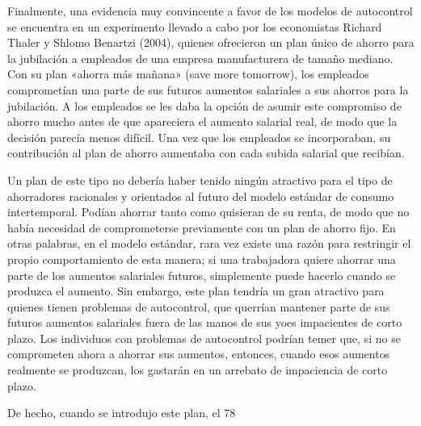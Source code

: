 \documentclass[10pt,a4paper]{article}
\begin{document}
Finalmente, una evidencia muy convincente a favor de los modelos de autocontrol se encuentra en un experimento llevado a cabo por los economistas Richard Thaler y Shlomo Benartzi (2004), quienes ofrecieron un plan único de ahorro para la jubilación a empleados de una empresa manufacturera de tamaño mediano. Con su plan «ahorra más mañana» (save more tomorrow), los empleados comprometían una parte de sus futuros aumentos salariales a sus ahorros para la jubilación. A los empleados se les daba la opción de asumir este compromiso de ahorro mucho antes de que apareciera el aumento salarial real, de modo que la decisión parecía menos difícil. Una vez que los empleados se incorporaban, su contribución al plan de ahorro aumentaba con cada subida salarial que recibían.

Un plan de este tipo no debería haber tenido ningún atractivo para el tipo de ahorradores racionales y orientados al futuro del modelo estándar de consumo intertemporal. Podían ahorrar tanto como quisieran de su renta, de modo que no había necesidad de comprometerse previamente con un plan de ahorro fijo. En otras palabras, en el modelo estándar, rara vez existe una razón para restringir el propio comportamiento de esta manera; si una trabajadora quiere ahorrar una parte de los aumentos salariales futuros, simplemente puede hacerlo cuando se produzca el aumento. Sin embargo, este plan tendría un gran atractivo para quienes tienen problemas de autocontrol, que querrían mantener parte de sus futuros aumentos salariales fuera de las manos de sus yoes impacientes de corto plazo. Los individuos con problemas de autocontrol podrían temer que, si no se comprometen ahora a ahorrar sus aumentos, entonces, cuando esos aumentos realmente se produzcan, los gastarán en un arrebato de impaciencia de corto plazo.

De hecho, cuando se introdujo este plan, el 78 %
\end{document}
